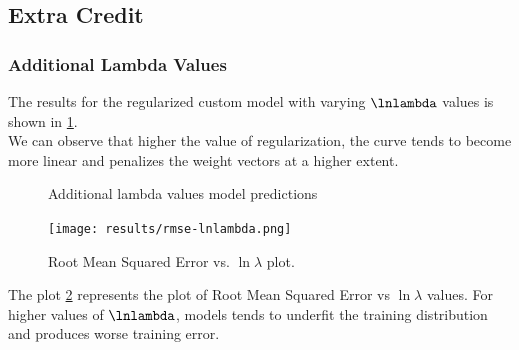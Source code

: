 \documentclass[12pt,twoside,a4paper]{article}
\begin{document}
\subsection{Extra Credit}

\subsubsection{Additional Lambda Values}

The results for the regularized custom model with varying $\lnlambda$ values is shown in \ref{VARLN}. \\ We can observe that higher the value of regularization, the curve tends to become more linear and penalizes the weight vectors at a higher extent.

\begin{figure}[H]
    \centering
    \hspace{0mm}
    \hspace{0mm}
    \hspace{0mm}
    \caption{Additional lambda values model predictions}
    \label{VARLN}
\end{figure}
\begin{figure}[H]
    \centering
    \texttt{[image: results/rmse-lnlambda.png]}
    \caption{Root Mean Squared Error vs. $\ln \lambda$ plot.}
    \label{LNLAMBDARMSE}
\end{figure}

The plot \ref{LNLAMBDARMSE} represents the plot of Root Mean Squared Error vs $\ln\lambda$ values. For higher values of $\lnlambda$, models tends to underfit the training distribution and produces worse training error.
\end{document}
